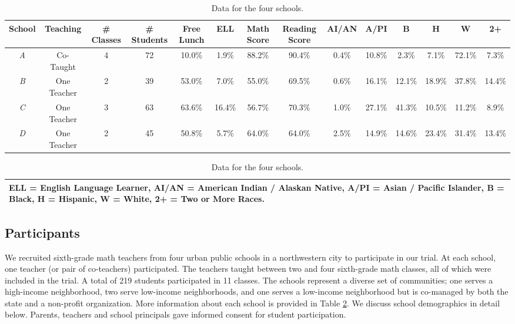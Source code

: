 \documentclass{sigchi}
\begin{document}
\begin{table}[ht]
\begin{center}
\scriptsize
\begin{tabular}{ | c | c | c | c | c | c | c | c | c | c | c | c | c | c | }
\hline
\bf{School} & \bf{Teaching} & \bf{\# Classes}  & \bf{\# Students}  & \bf{Free Lunch} & \bf{ELL} & \bf{Math Score} & \bf{Reading Score} & \bf{AI/AN}  & \bf{A/PI} & \bf{B}& \bf{H} & \bf{W} & \bf{2+}  \\ \hline
\emph{A} & Co-Taught & 4 & 72 & 10.0\% & 1.9\% & 88.2\% & 90.4\% & 0.4\% & 10.8\% & 2.3\% & 7.1\% & 72.1\% & 7.3\%   \\
\emph{B} & One Teacher & 2 & 39 & 53.0\% & 7.0\% & 55.0\% &  69.5\% & 0.6\% & 16.1\% & 12.1\% & 18.9\% & 37.8\% & 14.4\%   \\ 
\emph{C} & One Teacher & 3 & 63 & 63.6\% & 16.4\% & 56.7\% & 70.3\% & 1.0\% & 27.1\% & 41.3\% & 10.5\% & 11.2\% & 8.9\%   \\
\emph{D} & One Teacher & 2 & 45 & 50.8\% & 5.7\% & 64.0\% & 64.0\% & 2.5\%  & 14.9\% & 14.6\% & 23.4\% & 31.4\% & 13.4\%  \\   \hline
\end{tabular}
\newline
\vspace{0.001in}
\newline
\begin{tabular}{ | l | }
 \hline
{\bf ELL} = English Language Learner, {\bf AI/AN} = American Indian / Alaskan Native,  {\bf A/PI} = Asian / Pacific Islander,  {\bf B} = Black,  {\bf H} = Hispanic,  {\bf W} = White,  {\bf 2+} = Two or More Races.  \\
\hline
\end{tabular}
\end{center}
\vspace{0.04in}
\caption{Data for the four schools.}
\label{fig:Schools}
\end{table}

\subsection{Participants}
We recruited sixth-grade math teachers from four urban public schools in a northwestern city to participate in our trial. At each school, one teacher (or pair of co-teachers) participated. The teachers taught between two and four sixth-grade math classes, all of which were included in the trial.  A total of 219 students participated in 11 classes. The schools represent a diverse set of communities; one serves a high-income neighborhood, two serve low-income neighborhoods, and one serves a low-income neighborhood but is co-managed by both the state and a non-profit organization. More information about each school is provided in Table \ref{fig:Schools}. We discuss school demographics in detail below. Parents, teachers and school principals gave informed consent for student participation.
\end{document}
